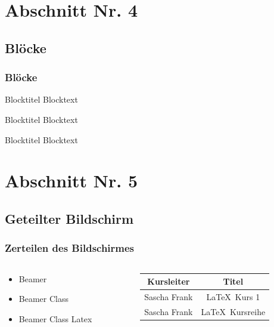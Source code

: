 \documentclass[handout]{beamer} %
\begin{document}
	
	\section{Abschnitt Nr. 4}
	\subsection{Bl\"ocke}
	\begin{frame}\frametitle{Bl\"ocke}
		
		\begin{block}{Blocktitel}
			Blocktext 
		\end{block}
		
		\begin{exampleblock}{Blocktitel}
			Blocktext 
		\end{exampleblock}
		
		
		\begin{alertblock}{Blocktitel}
			Blocktext 
		\end{alertblock}
	\end{frame}
	
	\section{Abschnitt Nr. 5}
	\subsection{Geteilter Bildschirm}
	
	\begin{frame}\frametitle{Zerteilen des Bildschirmes}
		\begin{columns}
			\begin{column}{6cm}
				\begin{itemize}
					\item Beamer 
					\item Beamer Class 
					\item Beamer Class Latex 
				\end{itemize}
			\end{column}
			\begin{column}{6cm}
				\begin{tabular}{|c|c|}
					\hline
					\textbf{Kursleiter} & \textbf{Titel} \\
					\hline
					Sascha Frank &  \LaTeX \ Kurs 1 \\
					\hline
					Sascha Frank & \LaTeX \ Kursreihe \\
					\hline
				\end{tabular}
			\end{column}
		\end{columns}
	\end{frame}
	
\end{document}
